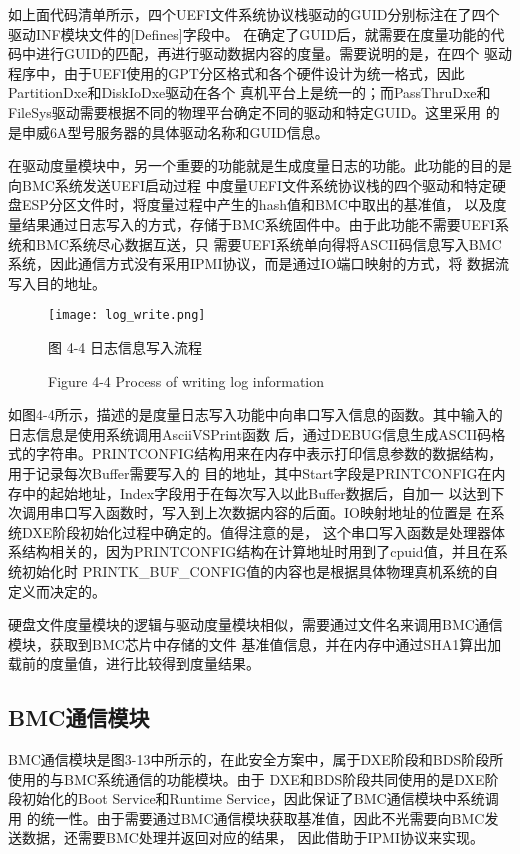如上面代码清单所示，四个UEFI文件系统协议栈驱动的GUID分别标注在了四个驱动INF模块文件的[Defines]字段中。
在确定了GUID后，就需要在度量功能的代码中进行GUID的匹配，再进行驱动数据内容的度量。需要说明的是，在四个
驱动程序中，由于UEFI使用的GPT分区格式和各个硬件设计为统一格式，因此PartitionDxe和DiskIoDxe驱动在各个
真机平台上是统一的；而PassThruDxe和FileSys驱动需要根据不同的物理平台确定不同的驱动和特定GUID。这里采用
的是申威6A型号服务器的具体驱动名称和GUID信息\cite{chinese7,addition2}。
\par 在驱动度量模块中，另一个重要的功能就是生成度量日志的功能。此功能的目的是向BMC系统发送UEFI启动过程
中度量UEFI文件系统协议栈的四个驱动和特定硬盘ESP分区文件时，将度量过程中产生的hash值和BMC中取出的基准值，
以及度量结果通过日志写入的方式，存储于BMC系统固件中。由于此功能不需要UEFI系统和BMC系统尽心数据互送，只
需要UEFI系统单向得将ASCII码信息写入BMC系统，因此通信方式没有采用IPMI协议，而是通过IO端口映射的方式，将
数据流写入目的地址。

\begin{figure}[htb]
    \vspace{0cm}   
    \setlength{\abovecaptionskip}{0.3cm}
	\centering
    \texttt{[image: log\_write.png]}
    \caption*{图 4-4 日志信息写入流程}
    \setlength{\belowcaptionskip}{-0.7cm}
    \caption*{Figure 4-4 Process of writing log information}
\end{figure}

如图4-4所示，描述的是度量日志写入功能中向串口写入信息的函数。其中输入的日志信息是使用系统调用AsciiVSPrint函数
后，通过DEBUG信息生成ASCII码格式的字符串。PRINTCONFIG结构用来在内存中表示打印信息参数的数据结构，用于记录每次Buffer需要写入的
目的地址，其中Start字段是PRINTCONFIG在内存中的起始地址，Index字段用于在每次写入以此Buffer数据后，自加一
以达到下次调用串口写入函数时，写入到上次数据内容的后面。IO映射地址的位置是
在系统DXE阶段初始化过程中确定的。值得注意的是，
这个串口写入函数是处理器体系结构相关的，因为PRINTCONFIG结构在计算地址时用到了cpuid值，并且在系统初始化时
PRINTK\_BUF\_CONFIG值的内容也是根据具体物理真机系统的自定义而决定的\cite{chinese13}。
\par 硬盘文件度量模块的逻辑与驱动度量模块相似，需要通过文件名来调用BMC通信模块，获取到BMC芯片中存储的文件
基准值信息，并在内存中通过SHA1算出加载前的度量值，进行比较得到度量结果。

\subsection{BMC通信模块}
BMC通信模块是图3-13中所示的，在此安全方案中，属于DXE阶段和BDS阶段所使用的与BMC系统通信的功能模块。由于
DXE和BDS阶段共同使用的是DXE阶段初始化的Boot Service和Runtime Service，因此保证了BMC通信模块中系统调用
的统一性。由于需要通过BMC通信模块获取基准值，因此不光需要向BMC发送数据，还需要BMC处理并返回对应的结果，
因此借助于IPMI协议来实现\cite{chinese26}。

